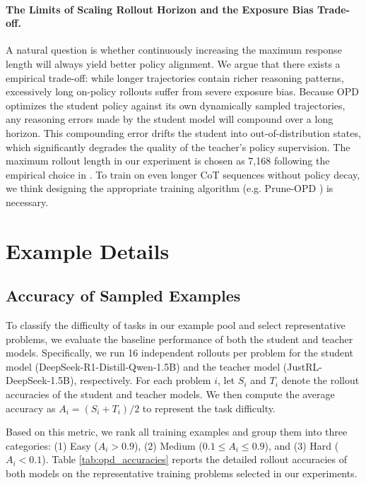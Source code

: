 \paragraph{The Limits of Scaling Rollout Horizon and the Exposure Bias Trade-off.}
A natural question is whether continuously increasing the maximum response length will always yield better policy alignment. We argue that there exists a empirical trade-off: while longer trajectories contain richer reasoning patterns, excessively long on-policy rollouts suffer from severe exposure bias. Because OPD optimizes the student policy against its own dynamically sampled trajectories, any reasoning errors made by the student model will compound over a long horizon. This compounding error drifts the student into out-of-distribution states, which significantly degrades the quality of the teacher's policy supervision. The maximum rollout length in our experiment is chosen as 7,168 following the empirical choice in \cite{li2026rethinking}. To train on even longer CoT sequences without policy decay, we think designing the appropriate training algorithm (e.g. Prune-OPD \citep{yang2026prune}) is necessary.

\section{Example Details} \label{app:sample_details}

\subsection{Accuracy of Sampled Examples}
To classify the difficulty of tasks in our example pool and select representative problems, we evaluate the baseline performance of both the student and teacher models. Specifically, we run 16 independent rollouts per problem for the student model (DeepSeek-R1-Distill-Qwen-1.5B) and the teacher model (JustRL-DeepSeek-1.5B), respectively. For each problem $i$, let $S_i$ and $T_i$ denote the rollout accuracies of the student and teacher models. We then compute the average accuracy as $A_i = (S_i + T_i)/2$ to represent the task difficulty.

Based on this metric, we rank all training examples and group them into three categories: (1) Easy ($A_i > 0.9$), (2) Medium ($0.1 \le A_i \le 0.9$), and (3) Hard ($A_i < 0.1$). Table \ref{tab:opd_accuracies} reports the detailed rollout accuracies of both models on the representative training problems selected in our experiments.


